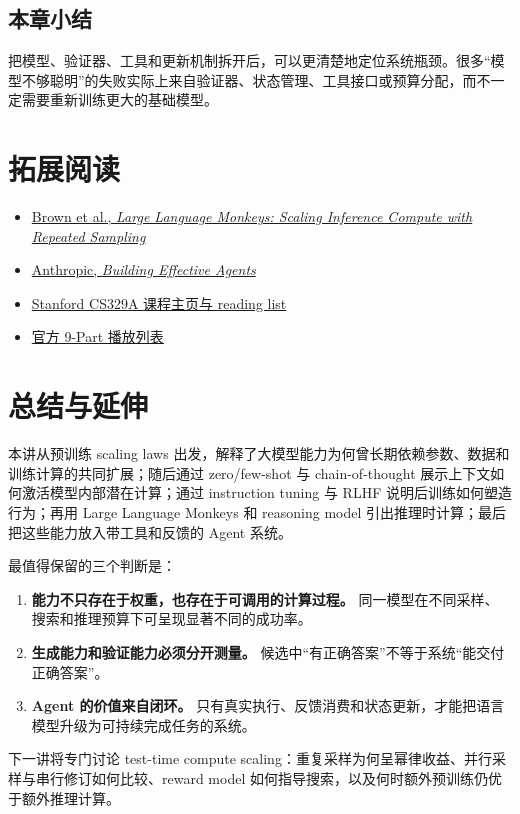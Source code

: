 \documentclass[a4paper]{article}
\begin{document}
\subsection{本章小结}

把模型、验证器、工具和更新机制拆开后，可以更清楚地定位系统瓶颈。很多“模型不够聪明”的失败实际上来自验证器、状态管理、工具接口或预算分配，而不一定需要重新训练更大的基础模型。

\section{拓展阅读}

\begin{itemize}
    \item \href{https://arxiv.org/abs/2407.21787}{Brown et al., \emph{Large Language Monkeys: Scaling Inference Compute with Repeated Sampling}}
    \item \href{https://www.anthropic.com/research/building-effective-agents}{Anthropic, \emph{Building Effective Agents}}
    \item \href{https://cs329a.stanford.edu/}{Stanford CS329A 课程主页与 reading list}
    \item \href{https://www.youtube.com/playlist?list=PLangBM27OtEA}{官方 9-Part 播放列表}
\end{itemize}

\section{总结与延伸}

本讲从预训练 scaling laws 出发，解释了大模型能力为何曾长期依赖参数、数据和训练计算的共同扩展；随后通过 zero/few-shot 与 chain-of-thought 展示上下文如何激活模型内部潜在计算；通过 instruction tuning 与 RLHF 说明后训练如何塑造行为；再用 Large Language Monkeys 和 reasoning model 引出推理时计算；最后把这些能力放入带工具和反馈的 Agent 系统。

最值得保留的三个判断是：

\begin{enumerate}
    \item \textbf{能力不只存在于权重，也存在于可调用的计算过程。} 同一模型在不同采样、搜索和推理预算下可呈现显著不同的成功率。
    \item \textbf{生成能力和验证能力必须分开测量。} 候选中“有正确答案”不等于系统“能交付正确答案”。
    \item \textbf{Agent 的价值来自闭环。} 只有真实执行、反馈消费和状态更新，才能把语言模型升级为可持续完成任务的系统。
\end{enumerate}

下一讲将专门讨论 test-time compute scaling：重复采样为何呈幂律收益、并行采样与串行修订如何比较、reward model 如何指导搜索，以及何时额外预训练仍优于额外推理计算。
\end{document}
